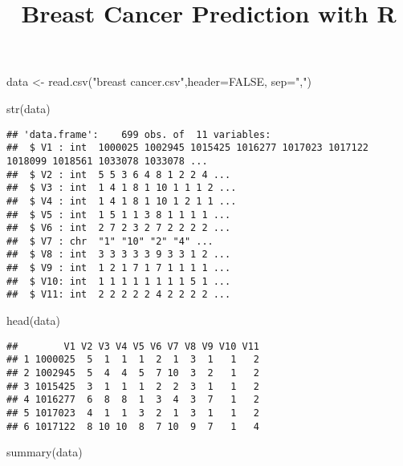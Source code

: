 \documentclass[
]{article}
\title{Breast Cancer Prediction with R}
\author{}
\date{\vspace{-2.5em}}
\newenvironment{Shaded}{\begin{snugshade}}{\end{snugshade}}
\newcommand{\AttributeTok}[1]{\textcolor[rgb]{0.77,0.63,0.00}{#1}}
\newcommand{\ConstantTok}[1]{\textcolor[rgb]{0.00,0.00,0.00}{#1}}
\newcommand{\FunctionTok}[1]{\textcolor[rgb]{0.00,0.00,0.00}{#1}}
\newcommand{\NormalTok}[1]{#1}
\newcommand{\OtherTok}[1]{\textcolor[rgb]{0.56,0.35,0.01}{#1}}
\newcommand{\StringTok}[1]{\textcolor[rgb]{0.31,0.60,0.02}{#1}}
\begin{document}
\maketitle

\begin{Shaded}
\begin{Highlighting}[]
\NormalTok{data }\OtherTok{\textless{}{-}} \FunctionTok{read.csv}\NormalTok{(}\StringTok{"breast cancer.csv"}\NormalTok{,}\AttributeTok{header=}\ConstantTok{FALSE}\NormalTok{, }\AttributeTok{sep=}\StringTok{","}\NormalTok{)}

\FunctionTok{str}\NormalTok{(data)}
\end{Highlighting}
\end{Shaded}

\begin{verbatim}
## 'data.frame':    699 obs. of  11 variables:
##  $ V1 : int  1000025 1002945 1015425 1016277 1017023 1017122 1018099 1018561 1033078 1033078 ...
##  $ V2 : int  5 5 3 6 4 8 1 2 2 4 ...
##  $ V3 : int  1 4 1 8 1 10 1 1 1 2 ...
##  $ V4 : int  1 4 1 8 1 10 1 2 1 1 ...
##  $ V5 : int  1 5 1 1 3 8 1 1 1 1 ...
##  $ V6 : int  2 7 2 3 2 7 2 2 2 2 ...
##  $ V7 : chr  "1" "10" "2" "4" ...
##  $ V8 : int  3 3 3 3 3 9 3 3 1 2 ...
##  $ V9 : int  1 2 1 7 1 7 1 1 1 1 ...
##  $ V10: int  1 1 1 1 1 1 1 1 5 1 ...
##  $ V11: int  2 2 2 2 2 4 2 2 2 2 ...
\end{verbatim}

\begin{Shaded}
\begin{Highlighting}[]
\FunctionTok{head}\NormalTok{(data)}
\end{Highlighting}
\end{Shaded}

\begin{verbatim}
##        V1 V2 V3 V4 V5 V6 V7 V8 V9 V10 V11
## 1 1000025  5  1  1  1  2  1  3  1   1   2
## 2 1002945  5  4  4  5  7 10  3  2   1   2
## 3 1015425  3  1  1  1  2  2  3  1   1   2
## 4 1016277  6  8  8  1  3  4  3  7   1   2
## 5 1017023  4  1  1  3  2  1  3  1   1   2
## 6 1017122  8 10 10  8  7 10  9  7   1   4
\end{verbatim}

\begin{Shaded}
\begin{Highlighting}[]
\FunctionTok{summary}\NormalTok{(data)}
\end{Highlighting}
\end{Shaded}
\end{document}
